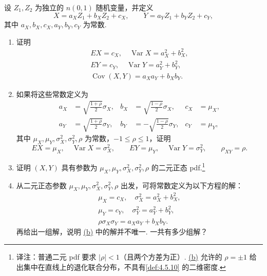 \begin{exercise}[二元正态分布的一种推导]\label{exercise:4.46}
设 $Z_1,Z_2$ 为独立的 $n(0,1)$ 随机变量，并定义
$$X=a_XZ_1+b_XZ_2+c_X,\qquad Y=a_YZ_1+b_YZ_2+c_Y,$$
其中 $a_X,b_X,c_X,a_Y,b_Y,c_Y$ 为常数.
\begin{enumerate}
\item[(a)] 证明
$$\begin{gathered}EX=c_X,\quad\operatorname{Var}X=a_X^2+b_X^2,\\EY=c_Y,\quad\operatorname{Var}Y=a_Y^2+b_Y^2,\\\operatorname{Cov}(X,Y)=a_Xa_Y+b_Xb_Y.\end{gathered}$$
\item[(b)]\label{itm:exercise:4.46:b} 如果将这些常数定义为
$$\begin{aligned}
a_X&=\sqrt{\frac{1+\rho}2}\sigma_X,&b_X&=\sqrt{\frac{1-\rho}2}\sigma_X,&c_X&=\mu_X,\\
a_Y&=\sqrt{\frac{1+\rho}2}\sigma_Y,&b_Y&=-\sqrt{\frac{1-\rho}2}\sigma_Y,&c_Y&=\mu_Y,
\end{aligned}$$
其中 $\mu_X,\mu_Y,\sigma_X^2,\sigma_Y^2,\rho$ 为常数，$-1\le\rho\le1$，证明
$$EX=\mu_X,\quad\operatorname{Var}X=\sigma_X^2,\qquad EY=\mu_Y,\quad\operatorname{Var}Y=\sigma_Y^2,\qquad\rho_{XY}=\rho.$$
\item[(c)] 证明 $(X,Y)$ 具有参数为 $\mu_X,\mu_Y,\sigma_X^2,\sigma_Y^2,\rho$ 的二元正态 pdf.\footnote{译注：普通二元 pdf 要求 $|\rho|<1$（且两个方差为正）. \hyperref[itm:exercise:4.46:b]{(b)} 允许的 $\rho=\pm1$ 给出集中在直线上的退化联合分布，不具有\autoref{def:4.5.10} 的二维密度.}
\item[(d)] 从二元正态参数 $\mu_X,\mu_Y,\sigma_X^2,\sigma_Y^2,\rho$ 出发，可将常数定义为以下方程的解：
$$\begin{gathered}\mu_X=c_X,\quad\sigma_X^2=a_X^2+b_X^2,\\\mu_Y=c_Y,\quad\sigma_Y^2=a_Y^2+b_Y^2,\\\rho\sigma_X\sigma_Y=a_Xa_Y+b_Xb_Y.\end{gathered}$$
再给出一组解，说明 \hyperref[itm:exercise:4.46:b]{(b)} 中的解并不唯一. 一共有多少组解？
\end{enumerate}
\end{exercise}

